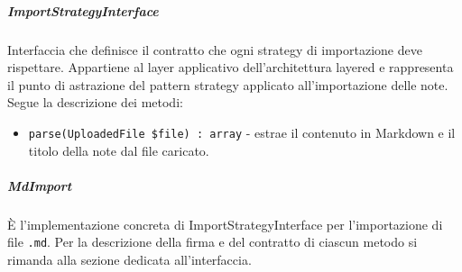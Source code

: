 \documentclass[a4paper,10pt]{article}
\begin{document}
\subparagraph{ImportStrategyInterface} Interfaccia che definisce il contratto che ogni strategy di importazione deve rispettare. Appartiene al layer applicativo dell'architettura layered e rappresenta il punto di astrazione del pattern strategy applicato all'importazione delle note. Segue la descrizione dei metodi:
\begin{itemize}
    \item \texttt{parse(UploadedFile \$file) : array} - estrae il contenuto in Markdown e il titolo della note dal file caricato.
\end{itemize}
\subparagraph{MdImport} È l'implementazione concreta di ImportStrategyInterface per l'importazione di file \texttt{.md}. Per la descrizione della firma e del contratto di ciascun metodo si rimanda alla sezione dedicata all'interfaccia.
\end{document}
